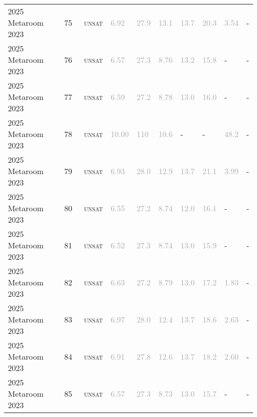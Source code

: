 \begin{center}
{\begin{longtable}{@{}llllllllll@{}}
2025 Metaroom 2023 & 75 & ~\textsc{unsat} & \textcolor{darkgray}{6.92} & \textcolor{darkgray}{27.9} & \textcolor{darkgray}{13.1} & \textcolor{darkgray}{13.7} & \textcolor{darkgray}{20.3} & \textcolor{darkgray}{3.54} & - \\
2025 Metaroom 2023 & 76 & ~\textsc{unsat} & \textcolor{darkgray}{6.57} & \textcolor{darkgray}{27.3} & \textcolor{darkgray}{8.76} & \textcolor{darkgray}{13.2} & \textcolor{darkgray}{15.8} & - & - \\
2025 Metaroom 2023 & 77 & ~\textsc{unsat} & \textcolor{darkgray}{6.59} & \textcolor{darkgray}{27.2} & \textcolor{darkgray}{8.78} & \textcolor{darkgray}{13.0} & \textcolor{darkgray}{16.0} & - & - \\
2025 Metaroom 2023 & 78 & ~\textsc{unsat} & \textcolor{darkgray}{10.00} & \textcolor{darkgray}{110} & \textcolor{darkgray}{10.6} & - & - & \textcolor{darkgray}{48.2} & - \\
2025 Metaroom 2023 & 79 & ~\textsc{unsat} & \textcolor{darkgray}{6.93} & \textcolor{darkgray}{28.0} & \textcolor{darkgray}{12.9} & \textcolor{darkgray}{13.7} & \textcolor{darkgray}{21.1} & \textcolor{darkgray}{3.99} & - \\
2025 Metaroom 2023 & 80 & ~\textsc{unsat} & \textcolor{darkgray}{6.55} & \textcolor{darkgray}{27.2} & \textcolor{darkgray}{8.74} & \textcolor{darkgray}{12.0} & \textcolor{darkgray}{16.1} & - & - \\
2025 Metaroom 2023 & 81 & ~\textsc{unsat} & \textcolor{darkgray}{6.52} & \textcolor{darkgray}{27.3} & \textcolor{darkgray}{8.74} & \textcolor{darkgray}{13.0} & \textcolor{darkgray}{15.9} & - & - \\
2025 Metaroom 2023 & 82 & ~\textsc{unsat} & \textcolor{darkgray}{6.63} & \textcolor{darkgray}{27.2} & \textcolor{darkgray}{8.79} & \textcolor{darkgray}{13.0} & \textcolor{darkgray}{17.2} & \textcolor{darkgray}{1.83} & - \\
2025 Metaroom 2023 & 83 & ~\textsc{unsat} & \textcolor{darkgray}{6.97} & \textcolor{darkgray}{28.0} & \textcolor{darkgray}{12.4} & \textcolor{darkgray}{13.7} & \textcolor{darkgray}{18.6} & \textcolor{darkgray}{2.63} & - \\
2025 Metaroom 2023 & 84 & ~\textsc{unsat} & \textcolor{darkgray}{6.91} & \textcolor{darkgray}{27.8} & \textcolor{darkgray}{12.6} & \textcolor{darkgray}{13.7} & \textcolor{darkgray}{18.2} & \textcolor{darkgray}{2.60} & - \\
2025 Metaroom 2023 & 85 & ~\textsc{unsat} & \textcolor{darkgray}{6.57} & \textcolor{darkgray}{27.3} & \textcolor{darkgray}{8.73} & \textcolor{darkgray}{13.0} & \textcolor{darkgray}{15.7} & - & - \\

\end{longtable}}
\end{center}
